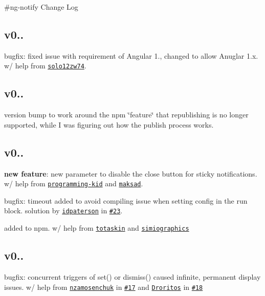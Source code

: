 \#ng-\/notify Change Log

\subsection*{v0..}


\begin{DoxyItemize}
\item bugfix\+: fixed issue with requirement of Angular 1., changed to allow Anuglar 1.\+x. w/ help from \href{https://github.com/solo12zw74}{\tt solo12zw74}.
\end{DoxyItemize}

\subsection*{v0..}


\begin{DoxyItemize}
\item version bump to work around the npm \char`\"{}feature\char`\"{} that republishing is no longer supported, while I was figuring out how the publish process works.
\end{DoxyItemize}

\subsection*{v0..}


\begin{DoxyItemize}
\item {\bfseries new feature}\+: new parameter to disable the close button for sticky notifications. w/ help from \href{https://github.com/programming-kid}{\tt programming-\/kid} and \href{https://github.com/maksad}{\tt maksad}.
\item bugfix\+: timeout added to avoid compiling issue when setting config in the run block. solution by \href{https://github.com/idpaterson}{\tt idpaterson} in \href{https://github.com/matowens/ng-notify/pull/23}{\tt \#23}.
\item added to npm. w/ help from \href{https://github.com/totaskin}{\tt totaskin} and \href{https://github.com/simiographics}{\tt simiographics}
\end{DoxyItemize}

\subsection*{v0..}


\begin{DoxyItemize}
\item bugfix\+: concurrent triggers of set() or dismiss() caused infinite, permanent display issues. w/ help from \href{https://github.com/nzamosenchuk}{\tt nzamosenchuk} in \href{https://github.com/matowens/ng-notify/issues/17}{\tt \#17} and \href{https://github.com/Droritos}{\tt Droritos} in \href{https://github.com/matowens/ng-notify/issues/18}{\tt \#18}
\end{DoxyItemize}

